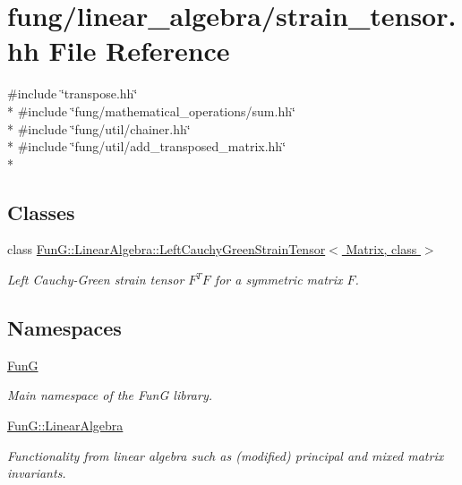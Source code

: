 \hypertarget{strain__tensor_8hh}{}\section{fung/linear\+\_\+algebra/strain\+\_\+tensor.hh File Reference}
\label{strain__tensor_8hh}
{\ttfamily \#include \char`\"{}transpose.\+hh\char`\"{}}\\*
{\ttfamily \#include \char`\"{}fung/mathematical\+\_\+operations/sum.\+hh\char`\"{}}\\*
{\ttfamily \#include \char`\"{}fung/util/chainer.\+hh\char`\"{}}\\*
{\ttfamily \#include \char`\"{}fung/util/add\+\_\+transposed\+\_\+matrix.\+hh\char`\"{}}\\*
\subsection*{Classes}
\begin{DoxyCompactItemize}
\item 
class \hyperlink{classFunG_1_1LinearAlgebra_1_1LeftCauchyGreenStrainTensor}{Fun\+G\+::\+Linear\+Algebra\+::\+Left\+Cauchy\+Green\+Strain\+Tensor$<$ Matrix, class $>$}
\begin{DoxyCompactList}\small\item\em Left Cauchy-\/\+Green strain tensor $ F^T F $ for a symmetric matrix $ F $. \end{DoxyCompactList}\end{DoxyCompactItemize}
\subsection*{Namespaces}
\begin{DoxyCompactItemize}
\item 
 \hyperlink{namespaceFunG}{FunG}
\begin{DoxyCompactList}\small\item\em Main namespace of the FunG library. \end{DoxyCompactList}\item 
 \hyperlink{namespaceFunG_1_1LinearAlgebra}{Fun\+G\+::\+Linear\+Algebra}
\begin{DoxyCompactList}\small\item\em Functionality from linear algebra such as (modified) principal and mixed matrix invariants. \end{DoxyCompactList}\end{DoxyCompactItemize}
